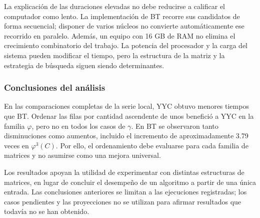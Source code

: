 La explicación de las duraciones elevadas no debe reducirse a
calificar el computador como lento. La implementación de BT
recorre sus candidatos de forma secuencial; disponer de varios
núcleos no convierte automáticamente ese recorrido en paralelo.
Además, un equipo con 16 GB de RAM no elimina el crecimiento
combinatorio del trabajo. La potencia del procesador y la carga
del sistema pueden modificar el tiempo, pero la estructura de
la matriz y la estrategia de búsqueda siguen siendo determinantes.

\subsubsection*{Conclusiones del análisis}

En las comparaciones completas de la serie local, YYC obtuvo
menores tiempos que BT. Ordenar las filas por cantidad ascendente
de unos benefició a YYC en la familia $\varphi$, pero no en todos
los casos de $\gamma$. En BT se observaron tanto disminuciones
como aumentos, incluido el incremento de aproximadamente 3.79 veces
en $\varphi^3(C)$. Por ello, el ordenamiento debe evaluarse para
cada familia de matrices y no asumirse como una mejora universal.

Los resultados apoyan la utilidad de experimentar con distintas
estructuras de matrices, en lugar de concluir el desempeño de un
algoritmo a partir de una única entrada. Las conclusiones anteriores
se limitan a las ejecuciones registradas; los casos pendientes y
las proyecciones no se utilizan para afirmar resultados que todavía
no se han obtenido.
